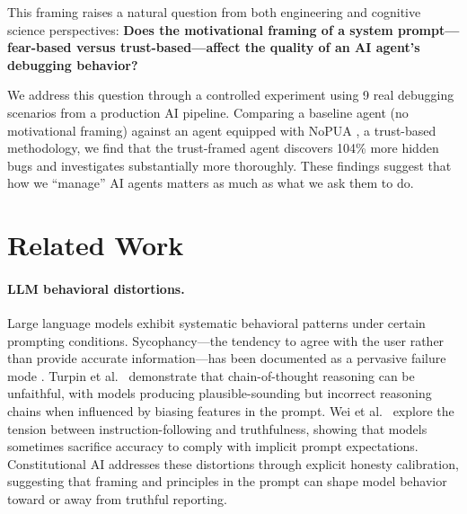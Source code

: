 \documentclass[11pt]{article}
\begin{document}
This framing raises a natural question from both engineering and cognitive science perspectives: \textbf{Does the motivational framing of a system prompt---fear-based versus trust-based---affect the quality of an AI agent's debugging behavior?}

We address this question through a controlled experiment using 9 real debugging scenarios from a production AI pipeline. Comparing a baseline agent (no motivational framing) against an agent equipped with NoPUA \cite{nopua2025}, a trust-based methodology, we find that the trust-framed agent discovers 104\% more hidden bugs and investigates substantially more thoroughly. These findings suggest that how we ``manage'' AI agents matters as much as what we ask them to do.

\section{Related Work}

\paragraph{LLM behavioral distortions.}
Large language models exhibit systematic behavioral patterns under certain prompting conditions. Sycophancy---the tendency to agree with the user rather than provide accurate information---has been documented as a pervasive failure mode \cite{sharma2023sycophancy}. Turpin et al.\  demonstrate that chain-of-thought reasoning can be unfaithful, with models producing plausible-sounding but incorrect reasoning chains when influenced by biasing features in the prompt. Wei et al.\  explore the tension between instruction-following and truthfulness, showing that models sometimes sacrifice accuracy to comply with implicit prompt expectations. Constitutional AI \cite{bai2022constitutional} addresses these distortions through explicit honesty calibration, suggesting that framing and principles in the prompt can shape model behavior toward or away from truthful reporting.
\end{document}
